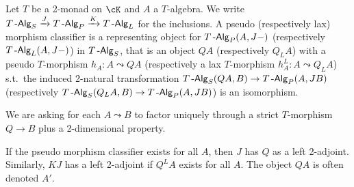 \documentclass[a4paper,11pt,oneside,openany]{scrbook}
\begin{document}
\begin{defn}
    Let $T$ be a 2-monad on $\cK$ and $A$ a $T$-algebra. We write
    $T\operatorname{-\mathsf{Alg}}_S\xrightarrow{J}T\operatorname{-\mathsf{Alg}}_P\xrightarrow{K}T\operatorname{-\mathsf{Alg}}_L$ for the inclusions. A
    pseudo (respectively lax) morphism classifier is a representing object
    for $T\operatorname{-\mathsf{Alg}}_P(A,J-)$ (respectively $T\operatorname{-\mathsf{Alg}}_L(A,J-)$) in $T\operatorname{-\mathsf{Alg}}_S$, that is an
    object $QA$ (respectively $Q_LA$) with a pseudo $T$-morphism $h_A\colon
    A\leadsto QA$ (respectively a lax $T$-morphism $h^L_A\colon A\leadsto Q_LA$)
    s.t.\ the induced 2-natural transformation $T\operatorname{-\mathsf{Alg}}_S(QA,B)\rightarrow
    T\operatorname{-\mathsf{Alg}}_P(A,JB)$ (respectively $T\operatorname{-\mathsf{Alg}}_S(Q_LA,B)\rightarrow T\operatorname{-\mathsf{Alg}}_P(A,JB)$) is
    an isomorphism.

    We are asking for each $A\leadsto B$ to factor uniquely through a strict
    $T$-morphism $Q\rightarrow B$ plus a 2-dimensional property.
\end{defn}

\begin{rmk}
    If the pseudo morphism classifier exists for all $A$, then $J$ has $Q$ as a
    left 2-adjoint. Similarly, $KJ$ has a left 2-adjoint if $Q^LA$ exists for
    all $A$. The object $QA$ is often denoted $A'$.
\end{rmk}
\end{document}
